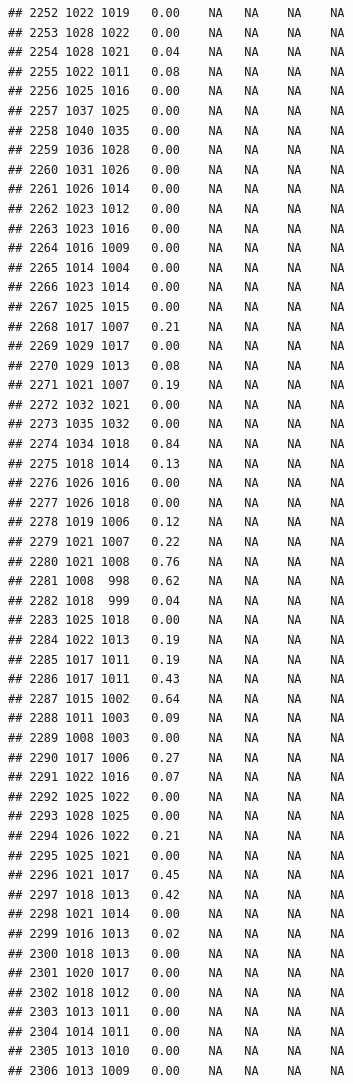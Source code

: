 \documentclass{article}\usepackage{graphicx, color}
\makeatletter
\newenvironment{kframe}{%
 \def\at@end@of@kframe{}%
 \ifinner\ifhmode%
  \def\at@end@of@kframe{\end{minipage}}%
  \begin{minipage}{\columnwidth}%
 \fi\fi%
 \def\FrameCommand##1{\hskip\@totalleftmargin \hskip-\fboxsep
 \colorbox{shadecolor}{##1}\hskip-\fboxsep
     \hskip-\linewidth \hskip-\@totalleftmargin \hskip\columnwidth}%
 \MakeFramed {\advance\hsize-\width
   \@totalleftmargin\z@ \linewidth\hsize
   \@setminipage}}%
 {\par\unskip\endMakeFramed%
 \at@end@of@kframe}
\newenvironment{knitrout}{}{} %
\makeatother
\begin{document}
\begin{knitrout}
\begin{kframe}
\begin{verbatim}
## 2252 1022 1019   0.00    NA   NA    NA    NA
## 2253 1028 1022   0.00    NA   NA    NA    NA
## 2254 1028 1021   0.04    NA   NA    NA    NA
## 2255 1022 1011   0.08    NA   NA    NA    NA
## 2256 1025 1016   0.00    NA   NA    NA    NA
## 2257 1037 1025   0.00    NA   NA    NA    NA
## 2258 1040 1035   0.00    NA   NA    NA    NA
## 2259 1036 1028   0.00    NA   NA    NA    NA
## 2260 1031 1026   0.00    NA   NA    NA    NA
## 2261 1026 1014   0.00    NA   NA    NA    NA
## 2262 1023 1012   0.00    NA   NA    NA    NA
## 2263 1023 1016   0.00    NA   NA    NA    NA
## 2264 1016 1009   0.00    NA   NA    NA    NA
## 2265 1014 1004   0.00    NA   NA    NA    NA
## 2266 1023 1014   0.00    NA   NA    NA    NA
## 2267 1025 1015   0.00    NA   NA    NA    NA
## 2268 1017 1007   0.21    NA   NA    NA    NA
## 2269 1029 1017   0.00    NA   NA    NA    NA
## 2270 1029 1013   0.08    NA   NA    NA    NA
## 2271 1021 1007   0.19    NA   NA    NA    NA
## 2272 1032 1021   0.00    NA   NA    NA    NA
## 2273 1035 1032   0.00    NA   NA    NA    NA
## 2274 1034 1018   0.84    NA   NA    NA    NA
## 2275 1018 1014   0.13    NA   NA    NA    NA
## 2276 1026 1016   0.00    NA   NA    NA    NA
## 2277 1026 1018   0.00    NA   NA    NA    NA
## 2278 1019 1006   0.12    NA   NA    NA    NA
## 2279 1021 1007   0.22    NA   NA    NA    NA
## 2280 1021 1008   0.76    NA   NA    NA    NA
## 2281 1008  998   0.62    NA   NA    NA    NA
## 2282 1018  999   0.04    NA   NA    NA    NA
## 2283 1025 1018   0.00    NA   NA    NA    NA
## 2284 1022 1013   0.19    NA   NA    NA    NA
## 2285 1017 1011   0.19    NA   NA    NA    NA
## 2286 1017 1011   0.43    NA   NA    NA    NA
## 2287 1015 1002   0.64    NA   NA    NA    NA
## 2288 1011 1003   0.09    NA   NA    NA    NA
## 2289 1008 1003   0.00    NA   NA    NA    NA
## 2290 1017 1006   0.27    NA   NA    NA    NA
## 2291 1022 1016   0.07    NA   NA    NA    NA
## 2292 1025 1022   0.00    NA   NA    NA    NA
## 2293 1028 1025   0.00    NA   NA    NA    NA
## 2294 1026 1022   0.21    NA   NA    NA    NA
## 2295 1025 1021   0.00    NA   NA    NA    NA
## 2296 1021 1017   0.45    NA   NA    NA    NA
## 2297 1018 1013   0.42    NA   NA    NA    NA
## 2298 1021 1014   0.00    NA   NA    NA    NA
## 2299 1016 1013   0.02    NA   NA    NA    NA
## 2300 1018 1013   0.00    NA   NA    NA    NA
## 2301 1020 1017   0.00    NA   NA    NA    NA
## 2302 1018 1012   0.00    NA   NA    NA    NA
## 2303 1013 1011   0.00    NA   NA    NA    NA
## 2304 1014 1011   0.00    NA   NA    NA    NA
## 2305 1013 1010   0.00    NA   NA    NA    NA
## 2306 1013 1009   0.00    NA   NA    NA    NA

\end{verbatim}
\end{kframe}
\end{knitrout}
\end{document}
